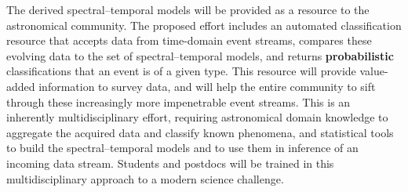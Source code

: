 \bigskip \centerline{}

The derived spectral--temporal models will be provided as a resource to the
astronomical community.  The proposed effort includes an automated classification resource
that accepts data from time-domain event streams, compares these evolving data
to the set of spectral--temporal models, and returns {\bf probabilistic}
classifications that an event is of a given type.  This resource will provide
value-added information to survey data, and will help the entire community to
sift through these increasingly more impenetrable event streams. This is an
inherently multidisciplinary effort, requiring astronomical domain knowledge to
aggregate the acquired data and classify known phenomena, and statistical tools
to build the spectral--temporal models and to use them in inference of an
incoming data stream. Students and postdocs will be trained in this multidisciplinary approach to a modern science challenge.
